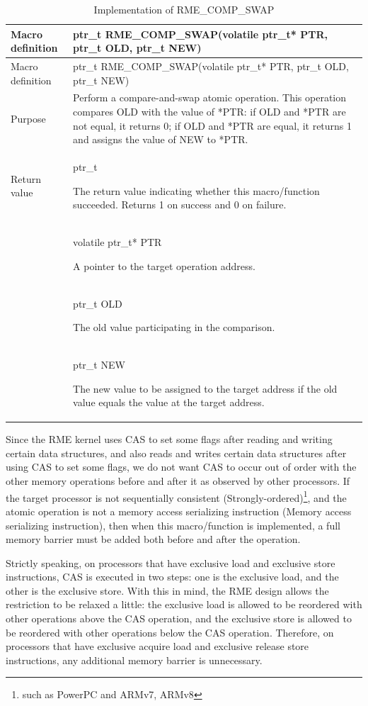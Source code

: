 \begin{xltabular}{\textwidth}{@{}>{\hsize\raggedright\arraybackslash}X>{\hsize\raggedright\arraybackslash}X@{}}
\caption{Implementation of RME\_COMP\_SWAP}\label{tab:7-31-rme-comp-swap-implementation}\\
\toprule
Macro definition & ptr\_t RME\_COMP\_SWAP(volatile ptr\_t* PTR, ptr\_t OLD, ptr\_t
NEW)\tabularnewline
\endfirsthead
\toprule
Macro definition & ptr\_t RME\_COMP\_SWAP(volatile ptr\_t* PTR, ptr\_t OLD, ptr\_t
NEW)\tabularnewline
\midrule
\endhead
\bottomrule
\endlastfoot
Purpose &
Perform a compare-and-swap atomic operation. This operation compares OLD with the value of *PTR: if OLD and *PTR are not equal, it returns 0; if OLD and *PTR are equal, it returns 1 and assigns the value of NEW to *PTR.\tabularnewline
Return value\strut
 & ptr\_t

The return value indicating whether this macro/function succeeded. Returns 1 on success and 0 on failure.\strut
\tabularnewline
{} & volatile ptr\_t* PTR

A pointer to the target operation address.\strut
\tabularnewline
\strut
 & ptr\_t OLD

The old value participating in the comparison.\strut
\tabularnewline
\strut
 & ptr\_t NEW

The new value to be assigned to the target address if the old value equals the value at the target address.\strut
\tabularnewline
\end{xltabular}
\nopagebreak[4]

Since the RME kernel uses CAS to set some flags after reading and writing certain data structures, and also reads and writes certain data structures after using CAS to set some flags, we do not want CAS to occur out of order with the other memory operations before and after it as observed by other processors. If the target processor is not sequentially consistent (Strongly-ordered)\footnote{such as PowerPC and ARMv7, ARMv8}, and the atomic operation is not a memory access serializing instruction (Memory
access serializing
instruction), then when this macro/function is implemented, a full memory barrier must be added both before and after the operation.

Strictly speaking, on processors that have exclusive load and exclusive store instructions, CAS is executed in two steps: one is the exclusive load, and the other is the exclusive store. With this in mind, the RME design allows the restriction to be relaxed a little: the exclusive load is allowed to be reordered with other operations above the CAS operation, and the exclusive store is allowed to be reordered with other operations below the CAS operation. Therefore, on processors that have exclusive acquire load and exclusive release store instructions, any additional memory barrier is unnecessary.

